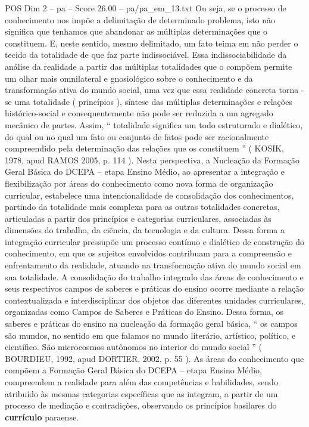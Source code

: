 \begin{textsample}{POS Dim 2 – pa – Score 26.00 – pa/pa\_em\_13.txt}
Ou seja, se o processo de conhecimento nos impõe a delimitação de determinado problema, isto não significa que tenhamos que abandonar as múltiplas determinações que o constituem.
E, neste sentido, mesmo delimitado, um fato teima em não perder o tecido da totalidade de que faz parte indissociável.
Essa indissociabilidade da análise da realidade a partir das múltiplas totalidades que o compõem permite um olhar mais omnilateral e gnosiológico sobre o conhecimento e da transformação ativa do mundo social, uma vez que essa realidade concreta torna -se uma totalidade ( princípios ), síntese das múltiplas determinações e relações histórico-social e consequentemente não pode ser reduzida a um agregado mecânico de partes.
Assim, “ totalidade significa um todo estruturado e dialético, do qual ou no qual um fato ou conjunto de fatos pode ser racionalmente compreendido pela determinação das relações que os constituem ” ( KOSIK, 1978, apud RAMOS 2005, p. 114 ).
Nesta perspectiva, a Nucleação da Formação Geral Básica do DCEPA – etapa Ensino Médio, ao apresentar a integração e flexibilização por áreas do conhecimento como nova forma de organização curricular, estabelece uma intencionalidade de consolidação dos conhecimentos, partindo da totalidade mais complexa para as outras totalidades concretas, articuladas a partir dos princípios e categorias curriculares, associadas às dimensões do trabalho, da ciência, da tecnologia e da cultura.
Dessa forma a integração curricular pressupõe um processo contínuo e dialético de construção do conhecimento, em que os sujeitos envolvidos contribuam para a compreensão e enfrentamento da realidade, atuando na transformação ativa do mundo social em sua totalidade.
A consolidação do trabalho integrado das áreas de conhecimento e seus respectivos campos de saberes e práticas do ensino ocorre mediante a relação contextualizada e interdisciplinar dos objetos das diferentes unidades curriculares, organizadas como Campos de Saberes e Práticas do Ensino.
Dessa forma, os saberes e práticas do ensino na nucleação da formação geral básica, “ os campos são mundos, no sentido em que falamos no mundo literário, artístico, político, e científico.
São microcosmos autônomos no interior do mundo social ” ( BOURDIEU, 1992, apud DORTIER, 2002, p. 55 ).
As áreas do conhecimento que compõem a Formação Geral Básica do DCEPA – etapa Ensino Médio, compreendem a realidade para além das competências e habilidades, sendo atribuído às mesmas categorias específicas que as integram, a partir de um processo de mediação e contradições, observando os princípios basilares do \textbf{currículo} paraense.

\end{textsample}
